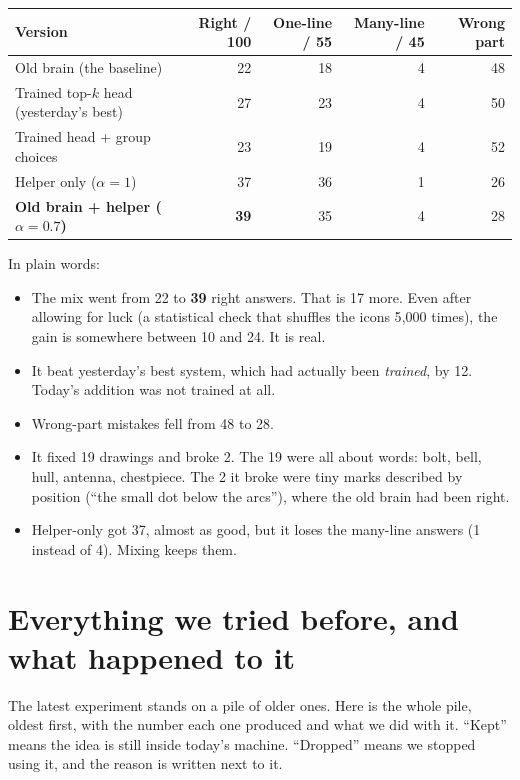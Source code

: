 \documentclass[11pt,a4paper]{article}
\begin{document}
\begin{center}
\small
\begin{tabular}{@{}lrrrr@{}}
\toprule
Version & Right / 100 & One-line / 55 & Many-line / 45 & Wrong part \\
\midrule
Old brain (the baseline) & 22 & 18 & 4 & 48 \\
Trained top-$k$ head (yesterday's best) & 27 & 23 & 4 & 50 \\
Trained head + group choices & 23 & 19 & 4 & 52 \\
Helper only ($\alpha = 1$) & 37 & 36 & 1 & 26 \\
\textbf{Old brain + helper ($\alpha = 0.7$)} & \textbf{39} & 35 & 4 & 28 \\
\bottomrule
\end{tabular}
\end{center}

In plain words:
\begin{itemize}[leftmargin=1.6em]
  \item The mix went from 22 to \textbf{39} right answers. That is 17 more. Even after allowing for luck (a statistical check that shuffles the icons 5{,}000 times), the gain is somewhere between 10 and 24. It is real.
  \item It beat yesterday's best system, which had actually been \emph{trained}, by 12. Today's addition was not trained at all.
  \item Wrong-part mistakes fell from 48 to 28.
  \item It fixed 19 drawings and broke 2. The 19 were all about words: bolt, bell, hull, antenna, chestpiece. The 2 it broke were tiny marks described by position (``the small dot below the arcs''), where the old brain had been right.
  \item Helper-only got 37, almost as good, but it loses the many-line answers (1 instead of 4). Mixing keeps them.
\end{itemize}

\section*{Everything we tried before, and what happened to it}

The latest experiment stands on a pile of older ones. Here is the whole pile, oldest first, with the number each one produced and what we did with it.
``Kept'' means the idea is still inside today's machine. ``Dropped'' means we stopped using it, and the reason is written next to it.
\end{document}
